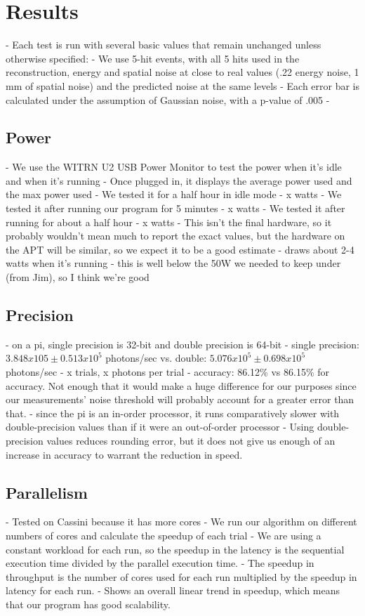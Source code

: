 \chapter{Results}
- Each test is run with several basic values that remain unchanged unless otherwise specified: 
- We use 5-hit events, with all 5 hits used in the reconstruction, energy and spatial noise at close to real values (.22 energy noise, 1 mm of spatial noise) and the predicted noise at the same levels
- Each error bar is calculated under the assumption of Gaussian noise, with a p-value of .005
- 

\section{Power}

- We use the WITRN U2 USB Power Monitor to test the power when it's idle and when it's running
- Once plugged in, it displays the average power used and the max power used
- We tested it for a half hour in idle mode - x watts
- We tested it after running our program for 5 minutes - x watts
- We tested it after running for about a half hour - x watts
- This isn't the final hardware, so it probably wouldn't mean much to report the exact values, but the hardware on the APT will be similar, so we expect it to be a good estimate
- draws about 2-4 watts when it's running
- this is well below the 50W we needed to keep under (from Jim), so I think we're good

\section{Precision}
- on a pi, single precision is 32-bit and double precision is 64-bit
- single precision: $3.848x105 \pm 0.513x10^5$ photons/sec vs. double: $5.076x10^5 \pm 0.698x10^5$ photons/sec
- x trials, x photons per trial
- accuracy: 86.12\% vs 86.15\% for accuracy. Not enough that it would make a huge difference for our purposes since our measurements' noise threshold will probably account for a greater error than that.
- since the pi is an in-order processor, it runs comparatively slower with double-precision values than if it were an out-of-order processor
- Using double-precision values reduces rounding error, but it does not give us enough of an increase in accuracy to warrant the reduction in speed.

\section{Parallelism}
- Tested on Cassini because it has more cores
- We run our algorithm on different numbers of cores and calculate the speedup of each trial
- We are using a constant workload for each run, so the speedup in the latency is the sequential execution time divided by the parallel execution time.
- The speedup in throughput is the number of cores used for each run multiplied by the speedup in latency for each run.
- Shows an overall linear trend in speedup, which means that our program has good scalability.

